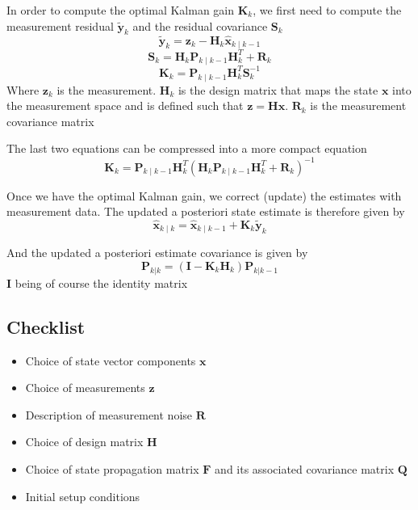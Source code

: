 \documentclass[12pt]{article}
\begin{document}
In order to compute the optimal Kalman gain $\mathbf{K}_k$, we first need to compute the measurement residual $\tilde{\mathbf{y}}_k$ and the residual covariance $\mathbf{S}_k$
\begin{equation}
\tilde{\mathbf{y}}_k = \mathbf{z}_k - \mathbf{H}_k\hat{\mathbf{x}}_{k\mid k-1}
\label{residual_eq}
\end{equation}
\begin{equation}
\mathbf{S}_k = \mathbf{H}_k \mathbf{P}_{k\mid k-1} \mathbf{H}_k^T + \mathbf{R}_k
\label{residual_cov_eq}
\end{equation}
\begin{equation}
\mathbf{K}_k = \mathbf{P}_{k\mid k-1}\mathbf{H}_k^T \mathbf{S}_k^{-1}
\label{kalman_gain_eq}
\end{equation}
Where $\mathbf{z}_k$ is the measurement.
$\mathbf{H}_k$ is the design matrix that maps the state $\mathbf{x}$ into the measurement space and is defined such that $\mathbf{z} = \mathbf{H}\mathbf{x}$.
$\mathbf{R}_k$ is the measurement covariance matrix

The last two equations can be compressed into a more compact equation
\begin{equation}
\mathbf{K}_k = \mathbf{P}_{k\mid k-1}\mathbf{H}_k^T (\mathbf{H}_k \mathbf{P}_{k\mid k-1} \mathbf{H}_k^T + \mathbf{R}_k)^{-1}
\end{equation}

Once we have the optimal Kalman gain, we correct (update) the estimates with measurement data.
The updated a posteriori state estimate is therefore given by
\begin{equation}
\hat{\mathbf{x}}_{k\mid k} = \hat{\mathbf{x}}_{k\mid k-1} + \mathbf{K}_k\tilde{\mathbf{y}}_k
\label{update_state_eq}
\end{equation}

And the updated a posteriori estimate covariance is given by
\begin{equation}
\mathbf{P}_{k|k} = (\mathbf{I} - \mathbf{K}_k \mathbf{H}_k) \mathbf{P}_{k|k-1}
\label{update_state_cov_eq}
\end{equation}
$\mathbf{I}$ being of course the identity matrix

\subsection{Checklist}

\begin{itemize}
\item Choice of state vector components $\mathbf{x}$
\item Choice of measurements $\mathbf{z}$
\item Description of measurement noise $\mathbf{R}$
\item Choice of design matrix $\mathbf{H}$
\item Choice of state propagation matrix $\mathbf{F}$ and its associated covariance matrix $\mathbf{Q}$
\item Initial setup conditions $ $
\end{itemize}
\end{document}
